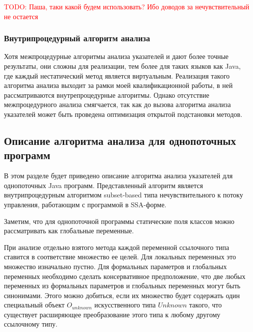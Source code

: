 \documentclass[14pt,titlepage]{extarticle}
\newcommand{\todo}[1]{\textcolor{red}{TODO: #1}}
\newcommand{\eng}[1]{{\English#1}}
\begin{document}
      \todo{Паша, таки какой будем использовать? Ибо доводов за
      нечувствительный не остается}

    \subsubsection{Внутрипроцедурный алгоритм анализа}

      Хотя межпроцедурные алгоритмы анализа указателей и дают более точные
      результаты, они сложны для реализации, тем более для таких
      языков как Java, где каждый нестатический метод является виртуальным.
      Реализация такого алгоритма анализа выходит за рамки моей
      квалификационной работы, в ней рассматриваются внутрепроцедурные
      алгоритмы. Однако отсутствие межпроцедурного анализа смягчается, так
      как до вызова алгоритма анализа указателей может быть проведена
      оптимизация открытой подстановки методов.

    \subsection{Описание алгоритма анализа для однопоточных программ}
      \label{section:detailed_lgorithm}

      В этом разделе будет приведено описание алгоритма анализа указателей
      для однопоточных Java программ.
      Представленный алгоритм является внутрипроцедурным алгоритмом
      \eng{subset-based} типа нечувствительного к потоку управления,
      работающим с программой в SSA-форме.

      Заметим, что для однопоточной программы статические поля классов можно
      рассматривать как глобальные переменные.

      При анализе отдельно взятого метода каждой переменной ссылочного типа
      ставится в соответствие множество ее целей. Для локальных переменных
      это множество изначально пустно. Для формальных параметров и глобальных
      переменных необходимо сделать консервативное предположение, что две любых
      переменных из формальных параметров и глобальных переменных могут быть
      синонимами. Этого можно добиться, если их множество будет содержать один
      специальный объект $O_{unknown}$ искусственного типа $Unknown$ такого,
      что существует расширяющее преобразование этого типа к любому другому
      ссылочному типу.
\end{document}
